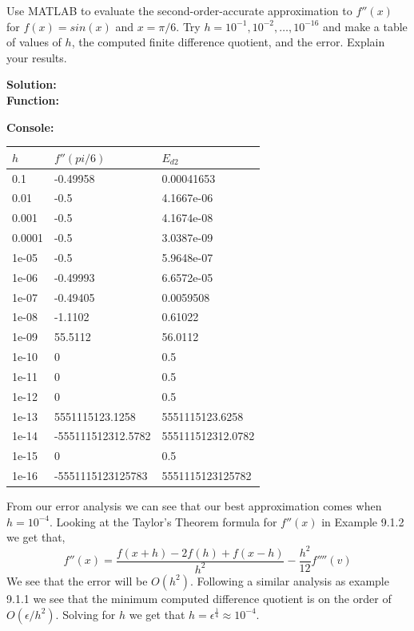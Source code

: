 \documentclass[12pt]{article}
\makeatletter
\theoremstyle{homework}
\newenvironment{exercise}[1]
{\def\@currentlabel{#1}\exercisecore}
{\endexercisecore}
\newcommand{\localhead}[1]{\par\smallskip\noindent\textbf{#1}\nobreak\\}%
\newcommand\solution{\localhead{Solution:}}
\makeatother
\begin{document}
\begin{exercise}{Problem 9.1} Use MATLAB to evaluate the second-order-accurate approximation
    to $f''(x)$ for $f(x) = sin(x)$ and $x = \pi/6$. Try $h = 10^{-1}, 10^{-2}, \dots, 10^{-16}$
    and make a table of values of $h$, the computed finite difference quotient, and the error. Explain your results.\\
\solution 

\textbf{Function:}
\begin{center}

\end{center}

\textbf{Console:}
\begin{center}

\end{center}

\begin{center}
\begin{tabular}{lll}
    $h$ & $f''(pi/6)$ & $E_{d2}$ \\ 
    \hline 
    0.1 & -0.49958 & 0.00041653 \\ 
    0.01 & -0.5 & 4.1667e-06 \\ 
    0.001 & -0.5 & 4.1674e-08 \\ 
    0.0001 & -0.5 & 3.0387e-09 \\ 
    1e-05 & -0.5 & 5.9648e-07 \\ 
    1e-06 & -0.49993 & 6.6572e-05 \\ 
    1e-07 & -0.49405 & 0.0059508 \\ 
    1e-08 & -1.1102 & 0.61022 \\ 
    1e-09 & 55.5112 & 56.0112 \\ 
    1e-10 & 0 & 0.5 \\ 
    1e-11 & 0 & 0.5 \\ 
    1e-12 & 0 & 0.5 \\ 
    1e-13 & 5551115123.1258 & 5551115123.6258 \\ 
    1e-14 & -555111512312.5782 & 555111512312.0782 \\ 
    1e-15 & 0 & 0.5 \\ 
    1e-16 & -5551115123125783 & 5551115123125782 \\ 
    \hline 
    \end{tabular}
\end{center}
From our error analysis we can see that our best approximation comes when $h = 10^{-4}$. Looking at the Taylor's
Theorem formula for $f''(x)$ in Example 9.1.2 we get that,
\begin{equation*}
    f''(x) = \dfrac{f(x+h) - 2f(h) + f(x - h)}{h^2} - \dfrac{h^2}{12}f''''(v)
\end{equation*}
We see that the error will be $O(h^2)$. Following a similar analysis as example 9.1.1 we see that the minimum computed difference
quotient is on the order of $O(\epsilon/h^2)$. Solving for $h$ we get that $h = \epsilon^{\frac{1}{4}}\approx 10^{-4}$.  
\end{exercise}
\vspace{.5in}
\end{document}
